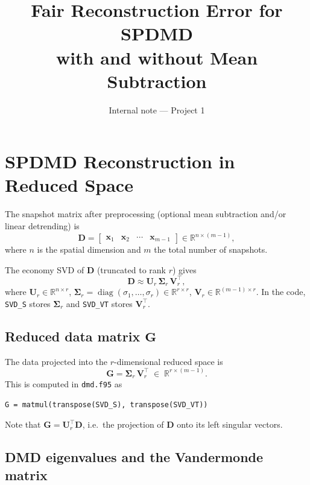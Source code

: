 \documentclass[11pt,a4paper]{article}
\title{Fair Reconstruction Error for SPDMD\\with and without Mean Subtraction}
\author{Internal note — Project 1}
\date{}
\newcommand{\diag}{\operatorname{diag}}
\newcommand{\Sigmat}{\bm{\Sigma}}
\begin{document}
\maketitle

\section{SPDMD Reconstruction in Reduced Space}

The snapshot matrix after preprocessing (optional mean subtraction and/or linear detrending) is
\begin{equation}
\bm{D} = \begin{bmatrix} \bm{x}_1 & \bm{x}_2 & \cdots & \bm{x}_{m-1} \end{bmatrix} \in \mathbb{R}^{n \times (m-1)},
\end{equation}
where $n$ is the spatial dimension and $m$ the total number of snapshots.

The economy SVD of $\bm{D}$ (truncated to rank $r$) gives
\begin{equation}\label{eq:svd}
\bm{D} \approx \bm{U}_r\,\Sigmat_r\,\bm{V}_r^\top,
\end{equation}
where $\bm{U}_r \in \mathbb{R}^{n\times r}$, $\Sigmat_r = \diag(\sigma_1,\ldots,\sigma_r) \in \mathbb{R}^{r\times r}$, $\bm{V}_r \in \mathbb{R}^{(m-1)\times r}$.
In the code, \texttt{SVD\_S} stores $\Sigmat_r$ and \texttt{SVD\_VT} stores $\bm{V}_r^\top$.

\subsection{Reduced data matrix \texorpdfstring{$\bm{G}$}{G}}

The data projected into the $r$-dimensional reduced space is
\begin{equation}\label{eq:G}
\bm{G} = \Sigmat_r\,\bm{V}_r^\top \;\in\; \mathbb{R}^{r \times (m-1)}.
\end{equation}
This is computed in \texttt{dmd.f95} as
\begin{verbatim}
G = matmul(transpose(SVD_S), transpose(SVD_VT))
\end{verbatim}
Note that $\bm{G} = \bm{U}_r^\top \bm{D}$, i.e.\ the projection of $\bm{D}$ onto its left singular vectors.

\subsection{DMD eigenvalues and the Vandermonde matrix}
\end{document}
